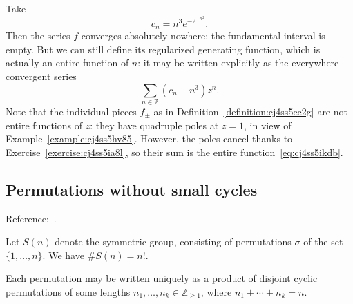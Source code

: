 \documentclass[reqno]{amsart}  \numberwithin{theorem}{section} \numberwithin{equation}{section}
\begin{document}
\begin{example}
  Take
  \begin{equation*}
    c_n = n^3 e^{- 2^{- n^2 }}.
  \end{equation*}
  Then the series $f$ converges absolutely nowhere: the fundamental interval is empty.  But we can still define its regularized generating function, which is actually an entire function of $n$: it may be written explicitly as the everywhere convergent series
  \begin{equation}\label{eq:cj4ss5ikdb}
\sum_{n \in \mathbb{Z} } (c_n - n^3) z^n.
\end{equation}
Note that the individual pieces $f_{\pm}$ as in Definition~\ref{definition:cj4ss5ec2g} are not entire functions of $z$: they have quadruple poles at $z=1$, in view of Example~\ref{example:cj4ss5hv85}.  However, the poles cancel thanks to Exercise~\ref{exercise:cj4ss5ia8l}, so their sum is the entire function~\eqref{eq:cj4ss5ikdb}.
\end{example}


\subsection{Permutations without small cycles}
Reference:~\cite[p176]{MR2172781}.

Let $S(n)$ denote the symmetric group, consisting of permutations $\sigma$ of the set $ \{1, \dotsc, n\}$.  We have $\# S(n) = n!$.

Each permutation may be written uniquely as a product of disjoint cyclic permutations of some lengths $n_1, \dotsc, n_k \in \mathbb{Z}_{\geq 1}$, where $n_1 + \dotsb + n_k = n$.
\end{document}
